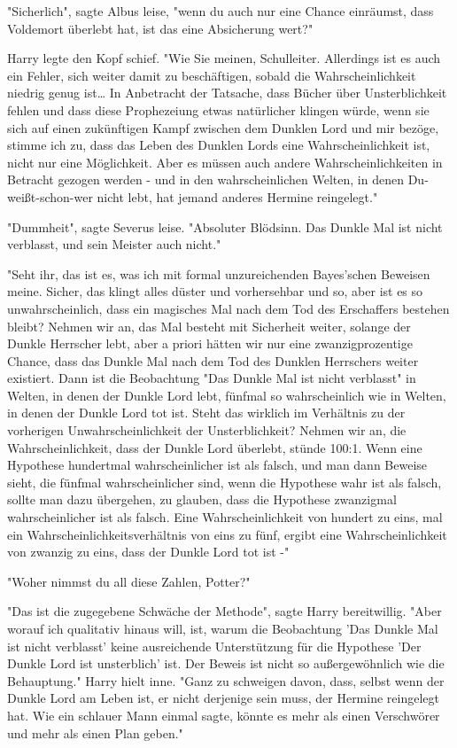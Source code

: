 {"Sicherlich", sagte Albus leise, "wenn du auch nur eine Chance einräumst, dass Voldemort überlebt hat, ist das eine Absicherung wert?"

Harry legte den Kopf schief. "Wie Sie meinen, Schulleiter. Allerdings ist es auch ein Fehler, sich weiter damit zu beschäftigen, sobald die Wahrscheinlichkeit niedrig genug ist… In Anbetracht der Tatsache, dass Bücher über Unsterblichkeit fehlen und dass diese Prophezeiung etwas natürlicher klingen würde, wenn sie sich auf einen zukünftigen Kampf zwischen dem Dunklen Lord und mir bezöge, stimme ich zu, dass das Leben des Dunklen Lords eine Wahrscheinlichkeit ist, nicht nur eine Möglichkeit. Aber es müssen auch andere Wahrscheinlichkeiten in Betracht gezogen werden - und in den wahrscheinlichen Welten, in denen Du-weißt-schon-wer nicht lebt, hat jemand anderes Hermine reingelegt."

"Dummheit", sagte Severus leise. "Absoluter Blödsinn. Das Dunkle Mal ist nicht verblasst, und sein Meister auch nicht."

"Seht ihr, das ist es, was ich mit formal unzureichenden Bayes'schen Beweisen meine. Sicher, das klingt alles düster und vorhersehbar und so, aber ist es so unwahrscheinlich, dass ein magisches Mal nach dem Tod des Erschaffers bestehen bleibt? Nehmen wir an, das Mal besteht mit Sicherheit weiter, solange der Dunkle Herrscher lebt, aber a priori hätten wir nur eine zwanzigprozentige Chance, dass das Dunkle Mal nach dem Tod des Dunklen Herrschers weiter existiert. Dann ist die Beobachtung "Das Dunkle Mal ist nicht verblasst" in Welten, in denen der Dunkle Lord lebt, fünfmal so wahrscheinlich wie in Welten, in denen der Dunkle Lord tot ist. Steht das wirklich im Verhältnis zu der vorherigen Unwahrscheinlichkeit der Unsterblichkeit? Nehmen wir an, die Wahrscheinlichkeit, dass der Dunkle Lord überlebt, stünde 100:1. Wenn eine Hypothese hundertmal wahrscheinlicher ist als falsch, und man dann Beweise sieht, die fünfmal wahrscheinlicher sind, wenn die Hypothese wahr ist als falsch, sollte man dazu übergehen, zu glauben, dass die Hypothese zwanzigmal wahrscheinlicher ist als falsch. Eine Wahrscheinlichkeit von hundert zu eins, mal ein Wahrscheinlichkeitsverhältnis von eins zu fünf, ergibt eine Wahrscheinlichkeit von zwanzig zu eins, dass der Dunkle Lord tot ist -"

"Woher nimmst du all diese Zahlen, Potter?"

"Das ist die zugegebene Schwäche der Methode", sagte Harry bereitwillig. "Aber worauf ich qualitativ hinaus will, ist, warum die Beobachtung 'Das Dunkle Mal ist nicht verblasst' keine ausreichende Unterstützung für die Hypothese 'Der Dunkle Lord ist unsterblich' ist. Der Beweis ist nicht so außergewöhnlich wie die Behauptung." Harry hielt inne. "Ganz zu schweigen davon, dass, selbst wenn der Dunkle Lord am Leben ist, er nicht derjenige sein muss, der Hermine reingelegt hat. Wie ein schlauer Mann einmal sagte, könnte es mehr als einen Verschwörer und mehr als einen Plan geben."

}
